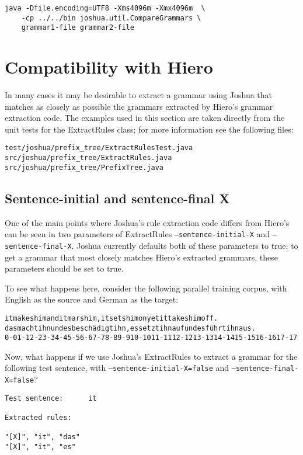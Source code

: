 \begin{verbatim}
java -Dfile.encoding=UTF8 -Xms4096m -Xmx4096m  \
    -cp ../../bin joshua.util.CompareGrammars \
    grammar1-file grammar2-file
\end{verbatim}


\section{Compatibility with Hiero}

In many cases it may be desirable to extract a grammar using Joshua that matches as closely as possible the grammars extracted by Hiero's grammar extraction code. The examples used in this section are taken directly from the unit tests for the ExtractRules class; for more information see the following files:

\begin{verbatim}
test/joshua/prefix_tree/ExtractRulesTest.java
src/joshua/prefix_tree/ExtractRules.java
src/joshua/prefix_tree/PrefixTree.java
\end{verbatim}


\subsection{Sentence-initial and sentence-final X}

One of the main points where Joshua's rule extraction code differs from Hiero's can be seen in two parameters of ExtractRules {\tt --sentence-initial-X} and {\tt --sentence-final-X}. Joshua currently defaults both of these parameters to true; to get a grammar that most closely matches Hiero's extracted grammars, these parameters should be set to true.

To see what happens here, consider the following parallel training corpus, with English as the source and German as the target:

\begin{alltt}
it makes him and it mars him , it sets him on yet it takes him off .
das macht ihn und es besch\"adigt ihn , es setzt ihn auf und es f\"uhrt ihn aus .
0-0 1-1 2-2 3-3 4-4 5-5 6-6 7-7 8-8 9-9 10-10 11-11 12-12 13-13 14-14 15-15 16-16 17-17
\end{alltt}

Now, what happens if we use Joshua's ExtractRules to extract a grammar for the following test sentence, with {\tt --sentence-initial-X=false} and {\tt --sentence-final-X=false}?

\begin{verbatim}
Test sentence:		it

Extracted rules:

"[X]", "it", "das"
"[X]", "it", "es"
\end{verbatim}

